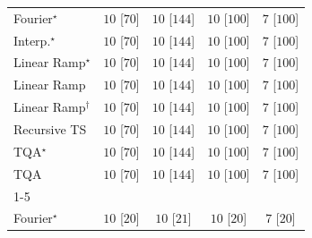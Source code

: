 \begin{tabular}{l|cccc|}
\midrule
Fourier$^\star$ & {\cellcolor[HTML]{00441B}} \color[HTML]{F1F1F1} $10$ [$70$] & {\cellcolor[HTML]{00441B}} \color[HTML]{F1F1F1} $10$ [$144$] & {\cellcolor[HTML]{00441B}} \color[HTML]{F1F1F1} $10$ [$100$] & {\cellcolor[HTML]{F7FCF5}} \color[HTML]{000000} $7$ [$100$] \\
Interp.$^\star$ & {\cellcolor[HTML]{00441B}} \color[HTML]{F1F1F1} $10$ [$70$] & {\cellcolor[HTML]{00441B}} \color[HTML]{F1F1F1} $10$ [$144$] & {\cellcolor[HTML]{00441B}} \color[HTML]{F1F1F1} $10$ [$100$] & {\cellcolor[HTML]{F7FCF5}} \color[HTML]{000000} $7$ [$100$] \\
Linear Ramp$^\star$ & {\cellcolor[HTML]{00441B}} \color[HTML]{F1F1F1} $10$ [$70$] & {\cellcolor[HTML]{00441B}} \color[HTML]{F1F1F1} $10$ [$144$] & {\cellcolor[HTML]{00441B}} \color[HTML]{F1F1F1} $10$ [$100$] & {\cellcolor[HTML]{F7FCF5}} \color[HTML]{000000} $7$ [$100$] \\
Linear Ramp & {\cellcolor[HTML]{00441B}} \color[HTML]{F1F1F1} $10$ [$70$] & {\cellcolor[HTML]{00441B}} \color[HTML]{F1F1F1} $10$ [$144$] & {\cellcolor[HTML]{00441B}} \color[HTML]{F1F1F1} $10$ [$100$] & {\cellcolor[HTML]{F7FCF5}} \color[HTML]{000000} $7$ [$100$] \\
Linear Ramp$^\dagger$ & {\cellcolor[HTML]{00441B}} \color[HTML]{F1F1F1} $10$ [$70$] & {\cellcolor[HTML]{00441B}} \color[HTML]{F1F1F1} $10$ [$144$] & {\cellcolor[HTML]{00441B}} \color[HTML]{F1F1F1} $10$ [$100$] & {\cellcolor[HTML]{F7FCF5}} \color[HTML]{000000} $7$ [$100$] \\
Recursive TS & {\cellcolor[HTML]{00441B}} \color[HTML]{F1F1F1} $10$ [$70$] & {\cellcolor[HTML]{00441B}} \color[HTML]{F1F1F1} $10$ [$144$] & {\cellcolor[HTML]{00441B}} \color[HTML]{F1F1F1} $10$ [$100$] & {\cellcolor[HTML]{F7FCF5}} \color[HTML]{000000} $7$ [$100$] \\
TQA$^\star$ & {\cellcolor[HTML]{00441B}} \color[HTML]{F1F1F1} $10$ [$70$] & {\cellcolor[HTML]{00441B}} \color[HTML]{F1F1F1} $10$ [$144$] & {\cellcolor[HTML]{00441B}} \color[HTML]{F1F1F1} $10$ [$100$] & {\cellcolor[HTML]{F7FCF5}} \color[HTML]{000000} $7$ [$100$] \\
TQA & {\cellcolor[HTML]{00441B}} \color[HTML]{F1F1F1} $10$ [$70$] & {\cellcolor[HTML]{00441B}} \color[HTML]{F1F1F1} $10$ [$144$] & {\cellcolor[HTML]{00441B}} \color[HTML]{F1F1F1} $10$ [$100$] & {\cellcolor[HTML]{F7FCF5}} \color[HTML]{000000} $7$ [$100$] \\
\cline{1-5}
\multicolumn{5}{c}{\rule{0pt}{8pt}SV} \\
\midrule
Fourier$^\star$ & {\cellcolor[HTML]{00441B}} \color[HTML]{F1F1F1} $10$ [$20$] & {\cellcolor[HTML]{00441B}} \color[HTML]{F1F1F1} $10$ [$21$] & {\cellcolor[HTML]{00441B}} \color[HTML]{F1F1F1} $10$ [$20$] & {\cellcolor[HTML]{F7FCF5}} \color[HTML]{000000} $7$ [$20$] \\

\end{tabular}
